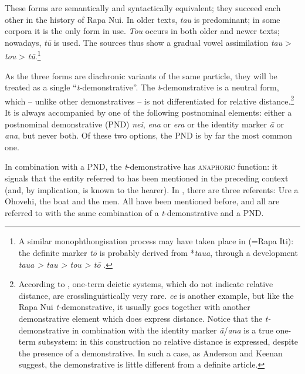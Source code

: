 These forms are semantically and syntactically equivalent; they succeed each other in the history of Rapa Nui. In older texts, \textit{tau} is predominant; in some corpora it is the only form in use. \textit{Tou} occurs in both older and newer texts; nowadays, \textit{tū} is used. The sources thus show a gradual vowel assimilation \textit{tau} {\textgreater} \textit{tou} {\textgreater} \textit{tū}.\footnote{\label{fn:212}A similar monophthongisation process may have taken place in  (=Rapa Iti): the definite marker \textit{tō} is probably derived from *\textit{taua}, through a development \textit{taua {\textgreater} tau {\textgreater} tou {\textgreater} tō} \citep[183]{Walworth2015Thesis}.} 

As the three forms are diachronic variants of the same particle, they will be treated as a single “\textit{t-}demonstrative”. The \textit{t}{}-demonstrative is a neutral form, which – unlike other demonstratives – is not differentiated for relative distance.\footnote{\label{fn:213}According to \citet[280]{AndersonKeenan1985}, one-term deictic systems, which do not indicate relative distance, are crosslinguistically very rare.  \textit{ce} is another example, but like the Rapa Nui \textit{t-}demonstrative, it usually goes together with another demonstrative element which does express distance. Notice that the \textit{t-}demonstrative in combination with the identity marker \textit{{\ꞌ}ā}/\textit{{\ꞌ}ana} is a true one-term subsystem: in this construction no relative distance is expressed, despite the presence of a demonstrative. In such a case, as Anderson and Keenan suggest, the demonstrative is little different from a definite article.}  It is always accompanied by one of the following postnominal elements: either a postnominal demonstrative (PND) \textit{nei}, \textit{ena} or \textit{era} or the identity marker \textit{{\ꞌ}ā} or \textit{{\ꞌ}ana}, but never both. Of these two options, the PND is by far the most common one.

In combination with a PND, the \textit{t}{}-demonstrative has \textsc{anaphoric} function: it signals that the entity referred to has been mentioned in the preceding context (and, by implication, is known to the hearer). In , there are three referents: Ure a Ohovehi, the boat and the men. All have been mentioned before, and all are referred to with the same combination of a \textit{t}{}-demonstrative and a PND. 

